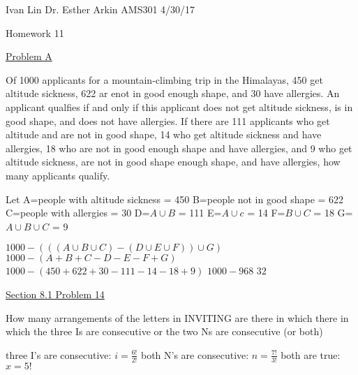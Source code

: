 \documentclass{article}
\begin{document}
Ivan Lin\newline{}
Dr. Esther Arkin\newline{}
AMS301\newline{}
4/30/17

\begin{center}
  Homework 11
\end{center}

\underline{Problem A}

Of 1000 applicants for a mountain-climbing trip in the Himalayas, 450 get altitude sickness, 622 ar enot in good enough shape, and 30 have allergies. An applicant qualfies if and only if this applicant does not get altitude sickness, is in good shape, and does not have allergies. If there are 111 applicants who get altitude and are not in good shape, 14 who get altitude sickness and have allergies, 18 who are not in good enough shape and have allergies, and 9 who get altitude sickness, are not in good shape enough shape, and have allergies, how many applicants qualify.\newline{}

Let A=people with altitude sickness = 450\newline{}
B=people not in good shape = 622\newline{}
C=people with allergies = 30\newline{}
D=$A\cup B$ = 111\newline{}
E=$A\cup c$ = 14\newline{}
F=$B\cup C$ = 18\newline{}
G=$A\cup B\cup C$ = 9\newline{}

$1000-(((A\cup B\cup C) - (D\cup E\cup F))\cup G)$\newline{}
$1000-(A+B+C-D-E-F+G)$\newline{}
$1000-(450+622+30-111-14-18+9)$\newline{}
$1000-968$\newline{}
$32$\newline{}


\underline{Section 8.1 Problem 14}\newline{}

How many arrangements of the letters in INVITING are there in which there in which the three Is are consecutive or the two Ns are consecutive (or both)\newline{}

three I's are consecutive: $i=\frac{6!}{2!}$\newline{}
both N's are consecutive: $n=\frac{7!}{3!}$\newline{}
both are true:$x=5!$\newline{}
\end{document}
